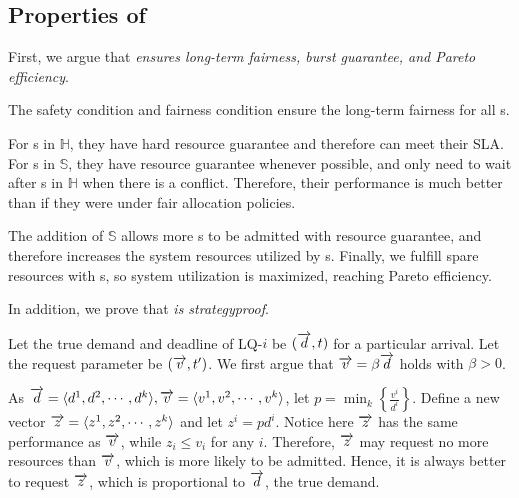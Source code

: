 \subsection{Properties of \name}
\label{sec:properties-theorem}


First, we argue that \emph{\name ensures long-term fairness, burst guarantee, and Pareto efficiency}. 

The safety condition and fairness condition ensure the long-term fairness for all {\batchq}s. %

For {\burstq}s in $\mathbb{H}$, they have hard resource guarantee and therefore can meet their SLA. For {\burstq}s in $\mathbb{S}$, they have resource guarantee whenever possible, and only need to wait after {\burstq}s in $\mathbb{H}$ when there is a conflict. Therefore, their performance is much better than if they were under fair allocation policies. %


The addition of $\mathbb{S}$ allows more {\burstq}s to be admitted with resource guarantee, and therefore increases the system resources utilized by {\burstq}s. Finally, we fulfill spare resources with {\batchq}s, so system utilization is maximized, reaching Pareto efficiency.

In addition, we prove that \emph{\name is strategyproof}. 

Let the true demand and deadline of LQ-$i$ be $(\protect\overrightarrow{d},t)$ for a particular arrival. Let the request parameter be $(\protect\overrightarrow{v},t')$. We first argue that $\protect\overrightarrow{v}=\beta \protect\overrightarrow{d}$ holds with $\beta>0$.

As $\protect\overrightarrow{d}=\langle d^1,d^2,\cdots,d^k \rangle,\protect\overrightarrow{v}=\langle v^1,v^2,\cdots,v^k \rangle$, let $p= \min_k \left\{\frac{v^i}{d^i}\right\}$. Define a new vector $\protect\overrightarrow{z}= \langle z^1,z^2,\cdots,z^k \rangle$ and let $z^i  = pd^i$. Notice here $\protect\overrightarrow{z}$ has the same performance as $\protect\overrightarrow{v}$, while $z_i \leq v_i$ for any $i$. Therefore, $\protect\overrightarrow{z}$ may request no more resources than $\protect\overrightarrow{v}$, which is more likely to be admitted. Hence, it is always better to request $\protect\overrightarrow{z}$, which is proportional to $\protect\overrightarrow{d}$, the true demand.

